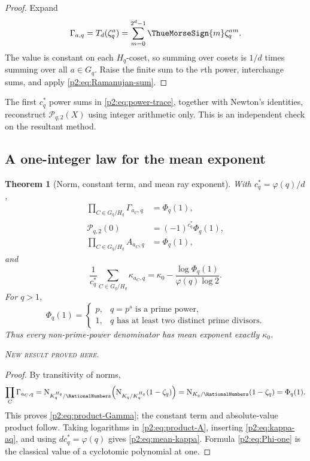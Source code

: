 \documentclass[11pt,oneside]{article}
\newtheorem{theorem}{Theorem}[section]
\theoremstyle{definition}
\theoremstyle{remark}
\newcommand{\FieldNorm}{\operatorname{N}}
\newcommand{\newresult}{\textcolor{newgreen}{\textsc{New result proved here.}}}
\begin{document}
\begin{proof}
Expand
\[
 \Gamma_{a,q}=T_d(\zeta_q^a)=\sum_{m=0}^{2^d-1}\ThueMorseSign{m}\zeta_q^{am}.
\]
The value is constant on each $H_q$-coset, so summing over cosets is $1/d$ times
summing over all $a\in G_q$. Raise the finite sum to the $r$th power, interchange
sums, and apply \eqref{p2:eq:Ramanujan-sum}.
\end{proof}

\begin{corollary}\label{p2:cor:Newton-reconstruction}
The first $c_q^*$ power sums in \eqref{p2:eq:power-trace}, together with Newton's
identities, reconstruct $\mathscr P_{q,2}(X)$ using integer arithmetic only.
This is an independent check on the resultant method.
\end{corollary}

\subsection{A one-integer law for the mean exponent}

\begin{theorem}[Norm, constant term, and mean ray exponent]\label{p2:thm:mean-exponent}
With $c_q^*=\varphi(q)/d$,
\begin{align}
 \prod_{C\in G_q/H_q}\Gamma_{a_C,q}&=\Phi_q(1),
 \label{p2:eq:product-Gamma}\\
 \mathscr P_{q,2}(0)&=(-1)^{c_q^*}\Phi_q(1),
 \label{p2:eq:P-constant}\\
 \prod_{C\in G_q/H_q}A_{a_C,q}&=\Phi_q(1),
 \label{p2:eq:product-A}
\end{align}
and
\begin{equation}
 \boxed{
 \frac1{c_q^*}\sum_{C\in G_q/H_q}\kappa_{a_C,q}
 =\kappa_0-\frac{\log\Phi_q(1)}{\varphi(q)\log2}.}
 \label{p2:eq:mean-kappa}
\end{equation}
For $q>1$,
\begin{equation}
 \Phi_q(1)=
 \begin{cases}
 p,&q=p^s\text{ is a prime power},\\
 1,&q\text{ has at least two distinct prime divisors}.
 \end{cases}
 \label{p2:eq:Phi-one}
\end{equation}
Thus every non-prime-power denominator has mean exponent exactly $\kappa_0$.

\smallskip\noindent\newresult
\end{theorem}

\begin{proof}
By transitivity of norms,
\[
 \prod_C\Gamma_{a_C,q}
 =\FieldNorm_{K_q^{H_q}/\RationalNumbers}
 \!\left(\FieldNorm_{K_q/K_q^{H_q}}(1-\zeta_q)\right)
 =\FieldNorm_{K_q/\RationalNumbers}(1-\zeta_q)=\Phi_q(1).
\]
This proves \eqref{p2:eq:product-Gamma}; the constant term and absolute-value product
follow. Taking logarithms in \eqref{p2:eq:product-A}, inserting \eqref{p2:eq:kappa-aq},
and using $dc_q^*=\varphi(q)$ gives \eqref{p2:eq:mean-kappa}. Formula
\eqref{p2:eq:Phi-one} is the classical value of a cyclotomic polynomial at one.
\end{proof}
\end{document}
